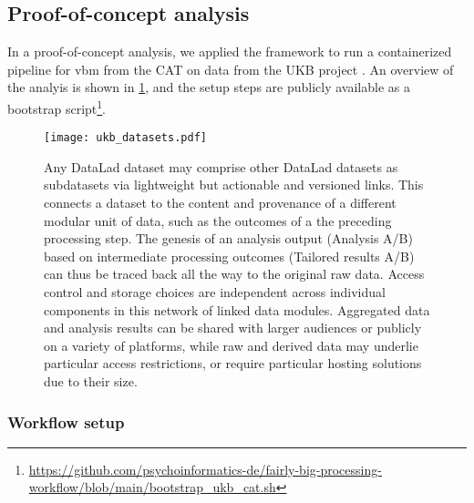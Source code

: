 \subsection{Proof-of-concept analysis}

In a proof-of-concept analysis, we applied the framework to run a containerized pipeline for \gls{vbm} \citep{ashburner2000voxel} from the \gls{CAT} \citep{gaser} on data from the UKB project \citep[][comprising 76 TB in 43 million files under strict usage constraints]{matthews2015uk}.
An overview of the analyis is shown in \cref{fig:fairly_datasets}, and the setup steps are publicly available as a bootstrap script\footnote{\url{https://github.com/psychoinformatics-de/fairly-big-processing-workflow/blob/main/bootstrap_ukb_cat.sh}}.

\begin{figure}
	\centering
	\texttt{[image: ukb\_datasets.pdf]}
	\caption[Overview of DataLad dataset linkage through processing and reuse]{Any DataLad dataset may comprise other DataLad datasets as subdatasets via lightweight but actionable and versioned links. This connects a dataset to the content and provenance of a different modular unit of data, such as the outcomes of a the preceding processing step. The genesis of an analysis output (Analysis A/B) based on intermediate processing outcomes (Tailored results A/B) can thus be traced back all the way to the original raw data. Access control and storage choices are independent across individual components in this network of linked data modules. Aggregated data and analysis results can be shared with larger audiences or publicly on a variety of platforms, while raw and derived data may underlie particular access restrictions, or require particular hosting solutions due to their size.}
	\label{fig:fairly_datasets}
\end{figure}

\subsubsection{Workflow setup}

